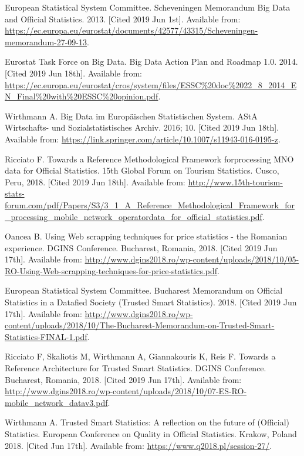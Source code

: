 \documentclass[]{article}
\begin{document}
\begin{thebibliography}{99}
	

European Statistical System Committee. Scheveningen Memorandum Big Data and Official Statistics. 2013. [Cited 2019 Jun 1st].
Available from: \url{https://ec.europa.eu/eurostat/documents/42577/43315/Scheveningen-memorandum-27-09-13}.

Eurostat Task Force on Big Data. Big Data Action Plan and Roadmap 1.0. 2014. [Cited 2019 Jun 18th].
Available from:
\url{https://ec.europa.eu/eurostat/cros/system/files/ESSC%20doc%2022_8_2014_EN_Final%20with%20ESSC%20opinion.pdf}. 
	
Wirthmann A. Big Data im Europäischen Statistischen System. AStA Wirtschafts- und Sozialstatistisches Archiv. 2016; 10. [Cited 2019 Jun 18th].
Available from:
\url{https://link.springer.com/article/10.1007/s11943-016-0195-z}.

Ricciato F. Towards a Reference Methodological Framework forprocessing MNO data for Official Statistics. 15th Global Forum on Tourism Statistics. Cusco, Peru, 2018. [Cited 2019 Jun 18th].
Available from:
\url{http://www.15th-tourism-stats-forum.com/pdf/Papers/S3/3_1_A_Reference_Methodological_Framework_for_processing_mobile_network_operatordata_for_official_statistics.pdf}.

Oancea B. Using Web scrapping techniques for price statistics - the Romanian experience. DGINS Conference. Bucharest, Romania, 2018. [Cited 2019 Jun 17th].
Available from:
\url{http://www.dgins2018.ro/wp-content/uploads/2018/10/05-RO-Using-Web-scrapping-techniques-for-price-statistics.pdf}. 

European Statistical System Committee. Bucharest Memorandum on Official Statistics in a Datafied Society (Trusted Smart Statistics). 2018. [Cited 2019 Jun 17th].
Available from: \url{http://www.dgins2018.ro/wp-content/uploads/2018/10/The-Bucharest-Memorandum-on-Trusted-Smart-Statistics-FINAL-1.pdf}.

Ricciato F, Skaliotis M, Wirthmann A, Giannakouris K, Reis F. Towards a Reference Architecture for Trusted Smart Statistics. DGINS Conference. Bucharest, Romania, 2018. [Cited 2019 Jun 17th].
Available from:
\url{http://www.dgins2018.ro/wp-content/uploads/2018/10/07-ES-RO-mobile_network_datav3.pdf}.

Wirthmann A. Trusted Smart Statistics: A reflection on the future of (Official) Statistics. European Conference on Quality in Official Statistics. Krakow, Poland 2018. [Cited Jun 17th].
Available from:
\url{https://www.q2018.pl/session-27/}.


\end{thebibliography}
\end{document}
